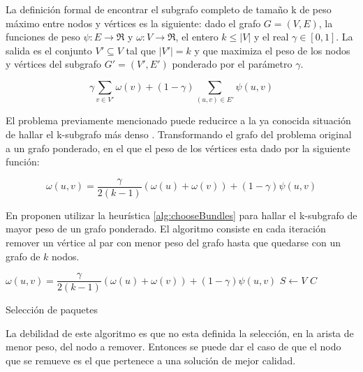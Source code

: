 La definición formal de encontrar el subgrafo completo de tamaño k de peso máximo entre nodos y vértices es la siguiente: dado el grafo $ G = (V,E) $, la funciones de peso $\psi : E \rightarrow \Re$ y $\omega : V \rightarrow \Re$, el entero $ k \leq |V| $ y el real $\gamma \in [0,1]$. La salida es el conjunto $V' \subseteq V$ tal que $|V'| = k$ y que maximiza el peso de los nodos y vértices del subgrafo $G' = (V', E')$ ponderado por el parámetro $\gamma$.

\begin{equation}
\gamma \sum_{v \in V'}{\omega(v)} + (1 - \gamma) \sum_{(u,v) \in E'}{\psi(u,v)}
\end{equation}

El problema previamente mencionado puede reducirce a la ya conocida situación de hallar el k-subgrafo más denso \cite{DBLP:journals/algorithmica/FeigePK01}. Transformando el grafo del problema original a un grafo ponderado, en el que el peso de los vértices esta dado por la siguiente función:
 
\begin{equation}
\omega(u,v) = \dfrac{\gamma}{2( k - 1)} (\omega(u) + \omega(v)) + (1 - \gamma)\psi(u,v) 
\end{equation}

En \cite{journals/tkde/Amer-YahiaBCFMZ14} proponen utilizar la heurística \ref{alg:chooseBundles} para hallar el k-subgrafo de mayor peso de un grafo ponderado. El algoritmo consiste en cada iteración remover un vértice al par con menor peso del grafo hasta que quedarse con un grafo de $k$ nodos.

\begin{center}
	\begin{algorithm}[H]
	\DontPrintSemicolon
	\SetAlgoLined
		$\omega(u,v) = \dfrac{\gamma}{2( k - 1)} (\omega(u) + \omega(v)) + (1 - \gamma)\psi(u,v)$\;
		$S \leftarrow V$\;
		\Return $C$\;
	\caption{Selección de paquetes}\label{alg:chooseBundles}
	\end{algorithm}
\end{center}


La debilidad de este algoritmo es que no esta definida la selección, en la arista de menor peso, del nodo a remover. Entonces se puede dar el caso de que el nodo que se remueve es el que pertenece a una solución de mejor calidad.

